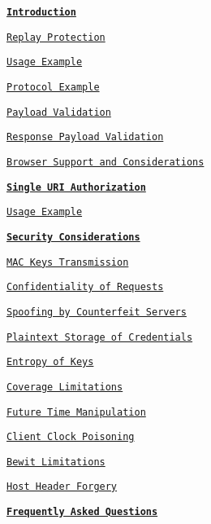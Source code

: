 \begin{DoxyItemize}
\item \href{#introduction}{\tt {\bfseries Introduction}}
\begin{DoxyItemize}
\item \href{#replay-protection}{\tt Replay Protection}
\item \href{#usage-example}{\tt Usage Example}
\item \href{#protocol-example}{\tt Protocol Example}
\begin{DoxyItemize}
\item \href{#payload-validation}{\tt Payload Validation}
\item \href{#response-payload-validation}{\tt Response Payload Validation}
\end{DoxyItemize}
\item \href{#browser-support-and-considerations}{\tt Browser Support and Considerations} 
\end{DoxyItemize}
\item \href{#single-uri-authorization}{\tt {\bfseries Single U\+RI Authorization}}
\begin{DoxyItemize}
\item \href{#bewit-usage-example}{\tt Usage Example} 
\end{DoxyItemize}
\item \href{#security-considerations}{\tt {\bfseries Security Considerations}}
\begin{DoxyItemize}
\item \href{#mac-keys-transmission}{\tt M\+AC Keys Transmission}
\item \href{#confidentiality-of-requests}{\tt Confidentiality of Requests}
\item \href{#spoofing-by-counterfeit-servers}{\tt Spoofing by Counterfeit Servers}
\item \href{#plaintext-storage-of-credentials}{\tt Plaintext Storage of Credentials}
\item \href{#entropy-of-keys}{\tt Entropy of Keys}
\item \href{#coverage-limitations}{\tt Coverage Limitations}
\item \href{#future-time-manipulation}{\tt Future Time Manipulation}
\item \href{#client-clock-poisoning}{\tt Client Clock Poisoning}
\item \href{#bewit-limitations}{\tt Bewit Limitations}
\item \href{#host-header-forgery}{\tt Host Header Forgery} 
\end{DoxyItemize}
\item \href{#frequently-asked-questions}{\tt {\bfseries Frequently Asked Questions}} 
\end{DoxyItemize}



